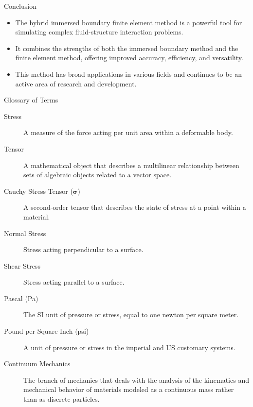 \documentclass{beamer}
\begin{document}
\begin{frame}{Conclusion}
    \begin{itemize}
        \item The hybrid immersed boundary finite element method is a powerful tool for simulating complex fluid-structure interaction problems.
        \item It combines the strengths of both the immersed boundary method and the finite element method, offering improved accuracy, efficiency, and versatility.
        \item This method has broad applications in various fields and continues to be an active area of research and development.
    \end{itemize}
\end{frame}

\begin{frame}{Glossary of Terms}
  \begin{description}
    \item[Stress] A measure of the force acting per unit area within a deformable body.
    \item[Tensor] A mathematical object that describes a multilinear relationship between sets of algebraic objects related to a vector space.
    \item[Cauchy Stress Tensor ($\boldsymbol{\sigma}$)] A second-order tensor that describes the state of stress at a point within a material.
    \item[Normal Stress] Stress acting perpendicular to a surface.
    \item[Shear Stress] Stress acting parallel to a surface.
    \item[Pascal (Pa)] The SI unit of pressure or stress, equal to one newton per square meter.
    \item[Pound per Square Inch (psi)] A unit of pressure or stress in the imperial and US customary systems.
    \item[Continuum Mechanics] The branch of mechanics that deals with the analysis of the kinematics and mechanical behavior of materials modeled as a continuous mass rather than as discrete particles.
  \end{description}
\end{frame}
\end{document}
